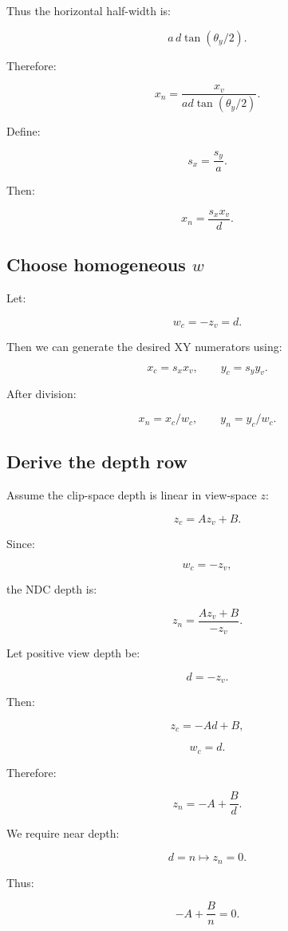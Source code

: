 Thus the horizontal half-width is:

\[
 a\,d\tan(\theta_y/2).
\]

Therefore:

\[
 \boxed{ x_n= \frac{x_v}{ad\tan(\theta_y/2)} }.
\]

Define:

\[
 \boxed{ s_x=\frac{s_y}{a} }.
\]

Then:

\[
 \boxed{ x_n=\frac{s_xx_v}{d} }.
\]

\subsection{\texorpdfstring{Choose homogeneous \(w\)}{Choose homogeneous w}}\label{02-foundations-ii-ch033-choose-homogeneous-w}

Let:

\[
 \boxed{ w_c=-z_v=d }.
\]

Then we can generate the desired XY numerators using:

\[
 x_c=s_xx_v, \qquad y_c=s_yy_v.
\]

After division:

\[
 x_n=x_c/w_c, \qquad y_n=y_c/w_c.
\]

\subsection{Derive the depth row}\label{02-foundations-ii-ch033-derive-the-depth-row}

Assume the clip-space depth is linear in view-space \(z\):

\[
 \boxed{ z_c=Az_v+B }.
\]

Since:

\[
 w_c=-z_v,
\]

the NDC depth is:

\[
 z_n= \frac{Az_v+B}{-z_v}.
\]

Let positive view depth be:

\[
 d=-z_v.
\]

Then:

\[
 z_c=-Ad+B,
\]

\[
 w_c=d.
\]

Therefore:

\[
 \boxed{ z_n=-A+\frac Bd }.
\]

We require near depth:

\[
 d=n\longmapsto z_n=0.
\]

Thus:

\[
 -A+\frac Bn=0.
\]

